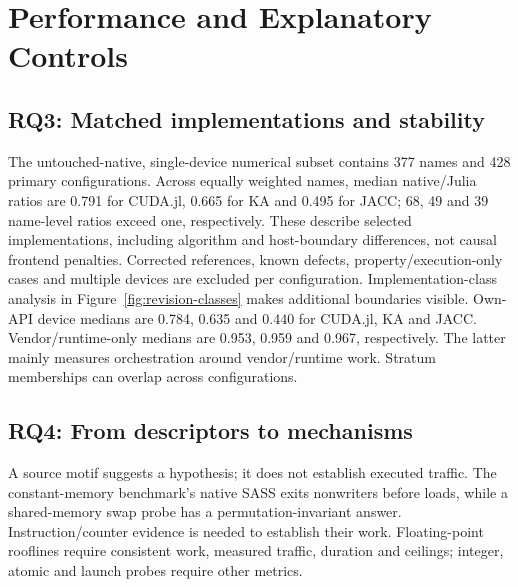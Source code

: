 \section{Performance and Explanatory Controls}
\label{sec:performance-results}
\subsection{RQ3: Matched implementations and stability}

The untouched-native, single-device numerical subset contains 377 names and 428 primary configurations. Across equally weighted names, median native/Julia ratios are 0.791 for CUDA.jl, 0.665 for KA and 0.495 for JACC; 68, 49 and 39 name-level ratios exceed one, respectively. These describe selected implementations, including algorithm and host-boundary differences, not causal frontend penalties. Corrected references, known defects, property/execution-only cases and multiple devices are excluded per configuration. Implementation-class analysis in Figure~\ref{fig:revision-classes} makes additional boundaries visible. Own-API device medians are 0.784, 0.635 and 0.440 for CUDA.jl, KA and JACC. Vendor/runtime-only medians are 0.953, 0.959 and 0.967, respectively. The latter mainly measures orchestration around vendor/runtime work. Stratum memberships can overlap across configurations.


\subsection{RQ4: From descriptors to mechanisms}
A source motif suggests a hypothesis; it does not establish executed traffic. The constant-memory benchmark's native SASS exits nonwriters before loads, while a shared-memory swap probe has a permutation-invariant answer. Instruction/counter evidence is needed to establish their work. Floating-point rooflines require consistent work, measured traffic, duration and ceilings; integer, atomic and launch probes require other metrics.

